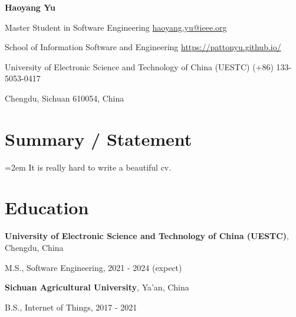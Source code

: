 \documentclass{article}
\begin{document}
\begin{center}
    \vspace*{5pt}
    \Huge{
    \textbf{Haoyang Yu}}
\end{center}
\vspace{15pt}




\setlength{\parskip}{1pt}

\noindent Master Student in Software Engineering \hfill \href{mailto:haoyang.yu@ieee.org}{haoyang.yu@ieee.org}

\noindent School of Information Software and Engineering \hfill \url{https://pattonyu.github.io/}

\noindent University of Electronic Science and Technology of China (UESTC) \hfill (+86) 133-5053-0417

\noindent Chengdu, Sichuan 610054, China

\setlength{\parskip}{3pt}




\section*{Summary / Statement}
\indent

\hangindent=2em It is really hard to write a beautiful cv.


\section*{Education}
\indent 

\textbf{University of Electronic Science and Technology of China (UESTC)}, Chengdu, China

\hspace{2em}M.S., Software Engineering, 2021 - 2024 (expect)

\textbf{Sichuan Agricultural University}, Ya'an, China

\hspace{2em}B.S., Internet of Things, 2017 - 2021





\end{document}
